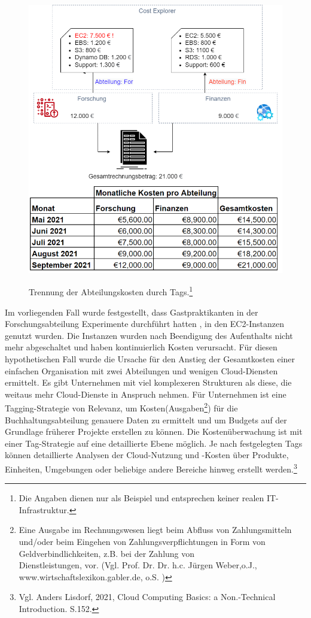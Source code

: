 \begin{figure}[h!]
  \centering
  \includegraphics[scale=0.5]{sources/BA Diagramme-Nach Abteilung.drawio}
  \caption[Trennung der Kosten durch Tags]{}
  \label{fig:BA Diagramme-Nach Abteilung.drawio} 
  Trennung der Abteilungskosten durch Tags.\footnote{Die Angaben dienen nur als Beispiel und entsprechen keiner realen IT-Infrastruktur.}
\end{figure}Im vorliegenden Fall wurde festgestellt, dass Gastpraktikanten in der Forschungsabteilung Experimente durchführt hatten , in den EC2-Instanzen genutzt wurden. Die Instanzen wurden nach Beendigung des Aufenthalts nicht mehr abgeschaltet und haben kontinuierlich Kosten verursacht. Für diesen hypothetischen Fall wurde die Ursache für den Anstieg der Gesamtkosten einer einfachen Organisation mit zwei Abteilungen und wenigen Cloud-Diensten ermittelt. Es gibt Unternehmen mit viel komplexeren Strukturen als diese, die weitaus mehr Cloud-Dienste in Anspruch nehmen. Für Unternehmen ist eine Tagging-Strategie von Relevanz, um Kosten(Ausgaben\footnote{ Eine Ausgabe im Rechnungswesen liegt beim Abfluss von Zahlungsmitteln und/oder beim Eingehen von Zahlungsverpflichtungen in Form von Geldverbindlichkeiten, z.B. bei der Zahlung von \\Dienstleistungen, vor. (Vgl. Prof. Dr. Dr. h.c. Jürgen Weber,o.J., www.wirtschaftslexikon.gabler.de, o.S. \cite{AUS})}) für die Buchhaltungsabteilung genauere Daten zu ermittelt und um Budgets auf der Grundlage früherer Projekte erstellen zu können. Die Kostenüberwachung ist mit einer Tag-Strategie auf eine detaillierte Ebene möglich. Je nach festgelegten Tags können detaillierte Analysen der Cloud-Nutzung und -Kosten über Produkte, Einheiten, Umgebungen oder beliebige andere Bereiche hinweg erstellt werden.\footnote{Vgl. Anders Lisdorf, 2021, Cloud Computing Basics: a Non.-Technical Introduction. S.152.\cite{CCB}}
